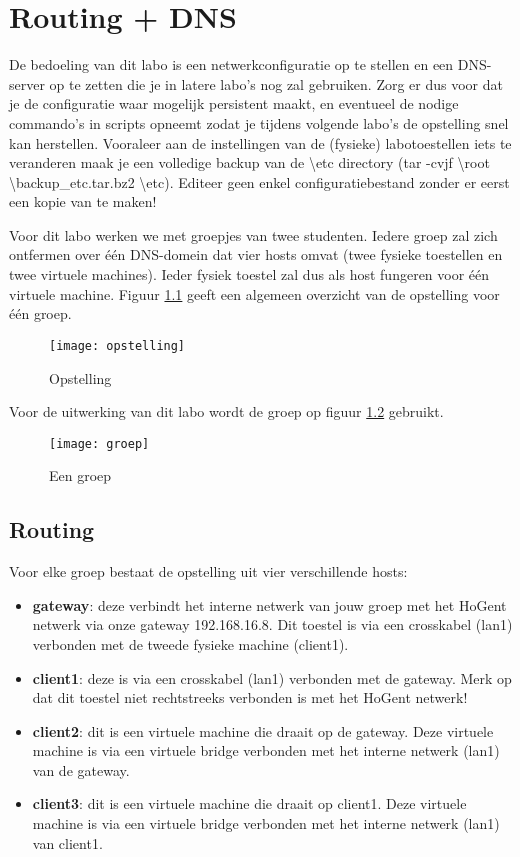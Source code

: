 \documentclass{report}
\begin{document}
	\tableofcontents
	
	\chapter{Routing + DNS}
	De bedoeling van dit labo is een netwerkconfiguratie op te stellen en een DNS-server op te zetten die je in latere labo's nog zal gebruiken. Zorg er dus voor dat je de configuratie waar mogelijk persistent maakt, en eventueel de nodige commando's in scripts opneemt zodat je tijdens volgende labo's de opstelling snel kan herstellen.  Vooraleer aan de instellingen van de (fysieke) labotoestellen iets te veranderen maak je een volledige backup van de \textbackslash etc directory (tar -cvjf \textbackslash root \textbackslash backup\_etc.tar.bz2 \textbackslash etc).
	Editeer geen enkel configuratiebestand zonder er eerst een kopie van te maken!
	
	Voor dit labo werken we met groepjes van twee studenten. Iedere groep zal zich ontfermen over één DNS-domein dat vier hosts omvat (twee fysieke toestellen en twee virtuele machines). Ieder fysiek toestel zal dus als host fungeren voor één virtuele machine. Figuur \ref{fig:opstelling} geeft een algemeen overzicht van de opstelling voor één groep.
	\begin{figure}
		\texttt{[image: opstelling]}
		\caption{Opstelling}
		\label{fig:opstelling}
	\end{figure}
	Voor de uitwerking van dit labo wordt de groep op figuur \ref{fig:groep} gebruikt.
	\begin{figure}
		\texttt{[image: groep]}
		\caption{Een groep}
		\label{fig:groep}
	\end{figure}
\section{Routing}
 Voor elke groep bestaat de opstelling uit vier verschillende hosts:
\begin{itemize}
	\item \textbf{gateway}: deze verbindt het interne netwerk van jouw groep met het HoGent netwerk via onze gateway 192.168.16.8. Dit toestel is via een crosskabel (lan1) verbonden met de tweede fysieke machine (client1).
	\item \textbf{client1}: deze is via een crosskabel (lan1) verbonden met de gateway. Merk op dat dit toestel niet rechtstreeks verbonden is met het HoGent netwerk!
	\item \textbf{client2}: dit is een virtuele machine die draait op de gateway. Deze virtuele machine is via een virtuele bridge verbonden met het interne netwerk (lan1) van de gateway.
	\item \textbf{client3}: dit is een virtuele machine die draait op client1. Deze virtuele machine is via een virtuele bridge verbonden met het interne netwerk (lan1) van client1.
	
\end{itemize}
\end{document}

